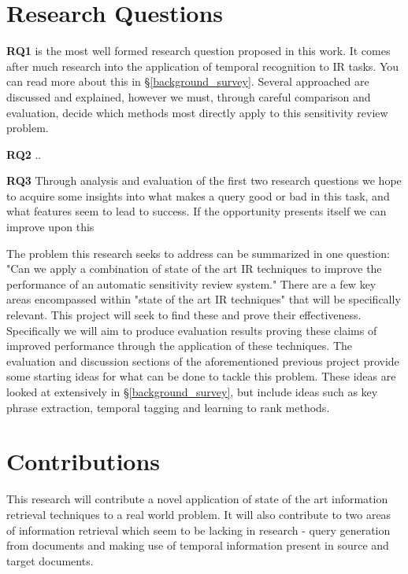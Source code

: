 \section{Research Questions}
\textbf{RQ1} is the most well formed research question proposed in this work. It comes after much research into the application of temporal recognition to IR tasks. You can read more about this in \S \ref{background_survey}. Several approached are discussed and explained, however we must, through careful comparison and evaluation, decide which methods most directly apply to this sensitivity review problem.

\textbf{RQ2} ..

\textbf{RQ3} Through analysis and evaluation of the first two research questions we hope to acquire some insights into what makes a query good or bad in this task, and what features seem to lead to success. If the opportunity presents itself we can improve upon this

The problem this research seeks to address can be summarized in one question: "Can we apply a combination of state of the art IR techniques to improve the performance of an automatic sensitivity review system." There are a few key areas encompassed within "state of the art IR techniques" that will be specifically relevant. This project will seek to find these and prove their effectiveness. Specifically we will aim to produce evaluation results proving these claims of improved performance through the application of these techniques. The evaluation and discussion sections of the aforementioned previous project provide some starting ideas for what can be done to tackle this problem. These ideas are looked at extensively in \S \ref{background_survey}, but include ideas such as key phrase extraction, temporal tagging and learning to rank methods.

\section{Contributions}
This research will contribute a novel application of state of the art information retrieval techniques to a real world problem. It will also contribute to two areas of information retrieval which seem to be lacking in research - query generation from documents and making use of temporal information present in source and target documents.

